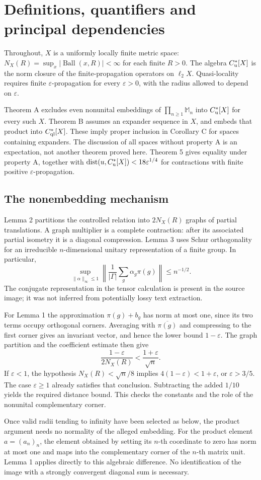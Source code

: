 \documentclass[10pt]{article}
\begin{document}
\section*{Definitions, quantifiers and principal dependencies}
Throughout, \(X\) is a uniformly locally finite metric space: \(N_X(R)=\sup_x|\operatorname{Ball}(x,R)|<\infty\) for each finite \(R>0\). The algebra \(C_{\rm u}^*[X]\) is the norm closure of the finite-propagation operators on \(\ell_2X\). Quasi-locality requires finite \(\varepsilon\)-propagation for every \(\varepsilon>0\), with the radius allowed to depend on \(\varepsilon\).\par
Theorem A excludes even nonunital embeddings of \(\prod_{n\ge1}\mathbb M_n\) into \(C_{\rm u}^*[X]\) for every such \(X\). Theorem B assumes an expander sequence in \(X\), and embeds that product into \(C_{\rm ql}^*[X]\). These imply proper inclusion in Corollary C for spaces containing expanders. The discussion of all spaces without property A is an expectation, not another theorem proved here. Theorem 5 gives equality under property A, together with \(\operatorname{dist}(u,C_{\rm u}^*[X])<18\varepsilon^{1/4}\) for contractions with finite positive \(\varepsilon\)-propagation.\par
\subsection*{The nonembedding mechanism}
Lemma 2 partitions the controlled relation into \(2N_X(R)\) graphs of partial translations. A graph multiplier is a complete contraction: after its associated partial isometry it is a diagonal compression. Lemma 3 uses Schur orthogonality for an irreducible \(n\)-dimensional unitary representation of a finite group. In particular, \[\sup_{\|\alpha\|_\infty\le1}
 \left\|\frac1{|\Gamma|}\sum_g\alpha_g\pi(g)\right\|
 \le n^{-1/2}.\] The conjugate representation in the tensor calculation is present in the source image; it was not inferred from potentially lossy text extraction.\par
For Lemma 1 the approximation \(\pi(g)+b_g\) has norm at most one, since its two terms occupy orthogonal corners. Averaging with \(\overline{\pi(g)}\) and compressing to the first corner gives an invariant vector, and hence the lower bound \(1-\varepsilon\). The graph partition and the coefficient estimate then give \[\frac{1-\varepsilon}{2N_X(R)}
 < \frac{1+\varepsilon}{\sqrt n}.\] If \(\varepsilon<1\), the hypothesis \(N_X(R)<\sqrt n/8\) implies \(4(1-\varepsilon)<1+\varepsilon\), or \(\varepsilon>3/5\). The case \(\varepsilon\ge1\) already satisfies that conclusion. Subtracting the added \(1/10\) yields the required distance bound. This checks the constants and the role of the nonunital complementary corner.\par
Once valid radii tending to infinity have been selected as below, the product argument needs no normality of the alleged embedding. For the product element \(a=(a_n)_n\), the element obtained by setting its \(n\)-th coordinate to zero has norm at most one and maps into the complementary corner of the \(n\)-th matrix unit. Lemma 1 applies directly to this algebraic difference. No identification of the image with a strongly convergent diagonal sum is necessary.\par
\end{document}

